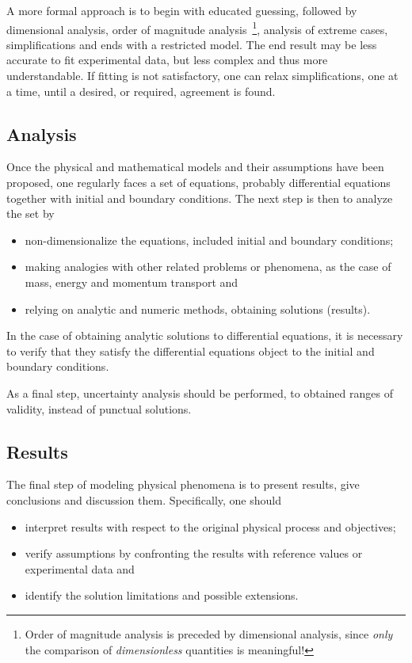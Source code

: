 A more formal approach is to begin with educated guessing, followed by dimensional analysis, order of magnitude analysis~\footnote{Order of magnitude analysis is preceded by dimensional analysis, since \emph{only} the comparison of \emph{dimensionless} quantities is meaningful!}, analysis of extreme cases, simplifications and ends with a restricted model. The end result may be less accurate to fit experimental data, but less complex and thus more understandable. If fitting is not satisfactory, one can relax simplifications, one at a time, until a desired, or required, agreement is found.


\subsection{Analysis}
Once the physical and mathematical models and their assumptions have been proposed, one regularly faces a set of equations, probably differential equations together with initial and boundary conditions. The next step is then to analyze the set by
\begin{itemize}
\item non-dimensionalize the equations, included initial and boundary conditions;
\item making analogies with other related problems or phenomena, as the case of mass, energy and momentum transport and
\item relying on analytic and numeric methods, obtaining solutions (results).
\end{itemize}

In the case of obtaining analytic solutions to differential equations, it is necessary to verify that they satisfy the differential equations object to the initial and boundary conditions.

As a final step, uncertainty analysis should be performed, to obtained ranges of validity, instead of punctual solutions.


\subsection{Results}
The final step of modeling physical phenomena is to present results, give conclusions and discussion them. Specifically, one should
\begin{itemize}
\item interpret results with respect to the original physical process and objectives;
\item verify assumptions by confronting the results with reference values or experimental data and
\item identify the solution limitations and possible extensions.
\end{itemize}
